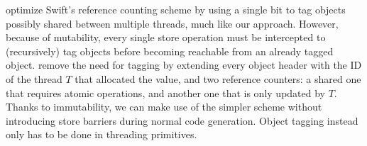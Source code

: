 \citet{dynamic-atomicity} optimize Swift's reference counting scheme
by using a single bit to tag objects possibly shared between multiple
threads, much like our approach. However, because of mutability, every
single store operation must be intercepted to (recursively) tag objects
before becoming reachable from an already tagged object.
\citet{biasedRC} remove the need for tagging by extending every object header
with the ID of the thread $T$ that allocated the value, and two
reference counters: a shared one that requires atomic operations, and
another one that is only updated by $T$.
Thanks to immutability, we can make use of the simpler scheme without
introducing store barriers during normal code generation. Object tagging
instead only has to be done in threading primitives.

